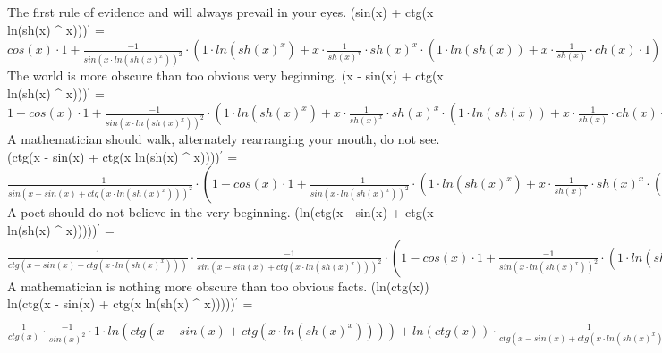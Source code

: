 \documentclass{article}
\begin{document}
{\large The first rule of evidence and will always prevail in your eyes. 
\newline\newline
(sin(x) + ctg(x \cdot ln(sh(x) ^ {x})))$^{'}$ = $cos(x) \cdot 1 + \frac{-1}{sin(x \cdot ln(sh(x) ^ {x})) ^ {2}} \cdot (1 \cdot ln(sh(x) ^ {x}) + x \cdot \frac{1}{sh(x) ^ {x}} \cdot sh(x) ^ {x} \cdot (1 \cdot ln(sh(x)) + x \cdot \frac{1}{sh(x)} \cdot ch(x) \cdot 1))$} \newline\newline
{\large The world is more obscure than too obvious very beginning. 
\newline\newline
(x - sin(x) + ctg(x \cdot ln(sh(x) ^ {x})))$^{'}$ = $1 - cos(x) \cdot 1 + \frac{-1}{sin(x \cdot ln(sh(x) ^ {x})) ^ {2}} \cdot (1 \cdot ln(sh(x) ^ {x}) + x \cdot \frac{1}{sh(x) ^ {x}} \cdot sh(x) ^ {x} \cdot (1 \cdot ln(sh(x)) + x \cdot \frac{1}{sh(x)} \cdot ch(x) \cdot 1))$} \newline\newline
{\large A mathematician should walk, alternately rearranging your mouth, do not see. 
\newline\newline
(ctg(x - sin(x) + ctg(x \cdot ln(sh(x) ^ {x}))))$^{'}$ = $\frac{-1}{sin(x - sin(x) + ctg(x \cdot ln(sh(x) ^ {x}))) ^ {2}} \cdot (1 - cos(x) \cdot 1 + \frac{-1}{sin(x \cdot ln(sh(x) ^ {x})) ^ {2}} \cdot (1 \cdot ln(sh(x) ^ {x}) + x \cdot \frac{1}{sh(x) ^ {x}} \cdot sh(x) ^ {x} \cdot (1 \cdot ln(sh(x)) + x \cdot \frac{1}{sh(x)} \cdot ch(x) \cdot 1)))$} \newline\newline
{\large A poet should do not believe in the very beginning. 
\newline\newline
(ln(ctg(x - sin(x) + ctg(x \cdot ln(sh(x) ^ {x})))))$^{'}$ = $\frac{1}{ctg(x - sin(x) + ctg(x \cdot ln(sh(x) ^ {x})))} \cdot \frac{-1}{sin(x - sin(x) + ctg(x \cdot ln(sh(x) ^ {x}))) ^ {2}} \cdot (1 - cos(x) \cdot 1 + \frac{-1}{sin(x \cdot ln(sh(x) ^ {x})) ^ {2}} \cdot (1 \cdot ln(sh(x) ^ {x}) + x \cdot \frac{1}{sh(x) ^ {x}} \cdot sh(x) ^ {x} \cdot (1 \cdot ln(sh(x)) + x \cdot \frac{1}{sh(x)} \cdot ch(x) \cdot 1)))$} \newline\newline
{\large A mathematician is nothing more obscure than too obvious facts. 
\newline\newline
(ln(ctg(x)) \cdot ln(ctg(x - sin(x) + ctg(x \cdot ln(sh(x) ^ {x})))))$^{'}$ = $\frac{1}{ctg(x)} \cdot \frac{-1}{sin(x) ^ {2}} \cdot 1 \cdot ln(ctg(x - sin(x) + ctg(x \cdot ln(sh(x) ^ {x})))) + ln(ctg(x)) \cdot \frac{1}{ctg(x - sin(x) + ctg(x \cdot ln(sh(x) ^ {x})))} \cdot \frac{-1}{sin(x - sin(x) + ctg(x \cdot ln(sh(x) ^ {x}))) ^ {2}} \cdot (1 - cos(x) \cdot 1 + \frac{-1}{sin(x \cdot ln(sh(x) ^ {x})) ^ {2}} \cdot (1 \cdot ln(sh(x) ^ {x}) + x \cdot \frac{1}{sh(x) ^ {x}} \cdot sh(x) ^ {x} \cdot (1 \cdot ln(sh(x)) + x \cdot \frac{1}{sh(x)} \cdot ch(x) \cdot 1)))$} \newline\newline
\end{document}
